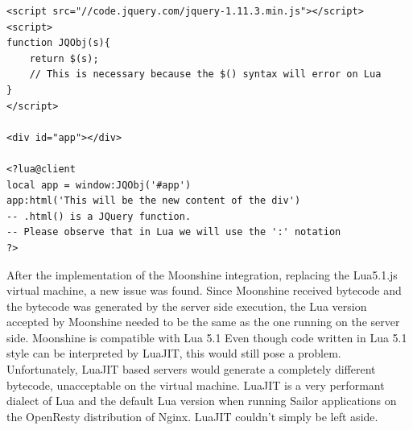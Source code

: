 \documentclass{article}
\begin{document}
\begin{enumerate}
\begin{lstlisting}[frame=single]
<script src="//code.jquery.com/jquery-1.11.3.min.js"></script>
<script>
function JQObj(s){
    return $(s);
    // This is necessary because the $() syntax will error on Lua
}
</script>

<div id="app"></div>

<?lua@client
local app = window:JQObj('#app')
app:html('This will be the new content of the div') 
-- .html() is a JQuery function. 
-- Please observe that in Lua we will use the ':' notation
?>
\end{lstlisting}
\end{enumerate}

After the implementation of the Moonshine integration, replacing the Lua5.1.js virtual machine, a new issue was found. Since Moonshine received bytecode and the bytecode was generated by the server side execution, the Lua version accepted by Moonshine needed to be the same as the one running on the server side. Moonshine is compatible with Lua 5.1 Even though code written in Lua 5.1 style can be interpreted by LuaJIT, this would still pose a problem. Unfortunately, LuaJIT based servers would generate a completely different bytecode, unacceptable on the virtual machine. LuaJIT is a very performant dialect of Lua and the default Lua version when running Sailor applications on the OpenResty distribution of Nginx. LuaJIT couldn't simply be left aside. \\
\end{document}
